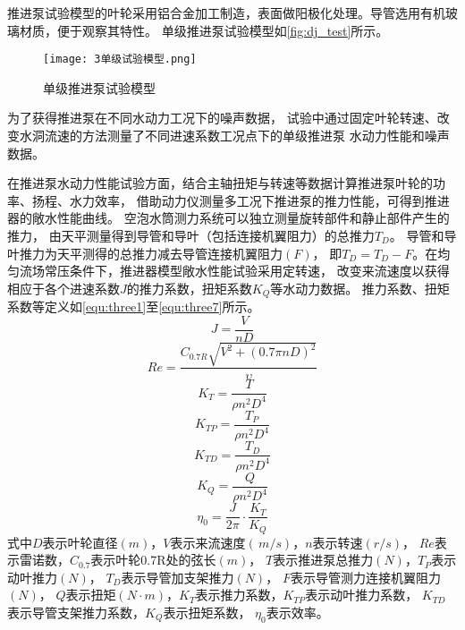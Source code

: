 推进泵试验模型的叶轮采用铝合金加工制造，表面做阳极化处理。导管选用有机玻璃材质，便于观察其特性。
单级推进泵试验模型如\autoref{fig:dj_test}所示。
\begin{figure}[htbp]
    \centering
    \texttt{[image: 3单级试验模型.png]}
    \caption{\label{fig:dj_test}单级推进泵试验模型}
\end{figure}
为了获得推进泵在不同水动力工况下的噪声数据，
试验中通过固定叶轮转速、改变水洞流速的方法测量了不同进速系数工况点下的单级推进泵
水动力性能和噪声数据。

在推进泵水动力性能试验方面，结合主轴扭矩与转速等数据计算推进泵叶轮的功率、扬程、水力效率，
借助动力仪测量多工况下推进泵的推力性能，可得到推进器的敞水性能曲线。
空泡水筒测力系统可以独立测量旋转部件和静止部件产生的推力，
由天平测量得到导管和导叶（包括连接机翼阻力）的总推力$T_{D}$。
导管和导叶推力为天平测得的总推力减去导管连接机翼阻力$(F)$，
即$T_{D}=T_{D}-F$。在均匀流场常压条件下，推进器模型敞水性能试验采用定转速，
改变来流速度以获得相应于各个进速系数$J$的推力系数，扭矩系数$K_{Q}$等水动力数据。
推力系数、扭矩系数等定义如\autoref{equ:three1}至\autoref{equ:three7}所示。
\begin{equation}
    \label{equ:three1}
    J=\frac{V}{nD} 
\end{equation}
\begin{equation}
    \label{equ:three2}
    Re =\frac{C_{0.7R}\sqrt{V^{2}+\left ( 0.7\pi nD \right )^{2}   }  }{\upsilon } 
\end{equation}
\begin{equation}
    \label{equ:three3}
    K_{T}=\frac{T}{\rho n^{2}D^{4}  }  
\end{equation}
\begin{equation}
    \label{equ:three4}
    K_{TP}=\frac{T_{P} }{\rho n^{2}D^{4}  }  
\end{equation}
\begin{equation}
    \label{equ:three5}
    K_{TD}=\frac{T_{D} }{\rho n^{2}D^{4}  }  
\end{equation}
\begin{equation}
    \label{equ:three6}
    K_{Q}=\frac{Q}{\rho n^{2}D^{4}  }  
\end{equation}
\begin{equation}
    \label{equ:three7}
    \eta _{0} =\frac{J}{2\pi } \cdot \frac{K_{T} }{K_{Q}} 
\end{equation}
式中$D$表示叶轮直径$(m)$，$V$表示来流速度$(\,m/s)$，$n$表示转速$(r/s)$，
$Re$表示雷诺数，$C_{0.7}$表示叶轮0.7R处的弦长$(m)$，
$T$表示推进泵总推力$(N)$，$T_{P}$表示动叶推力$(N)$，
$T_{D} $表示导管加支架推力$(N)$，
$F$表示导管测力连接机翼阻力$(N)$，
$Q$表示扭矩$(N \cdot m)$，$K_{T}$表示推力系数，$K_{TP}$表示动叶推力系数，
$K_{TD}$表示导管支架推力系数，$K_{Q}$表示扭矩系数，
$\eta _{0}$表示效率。

